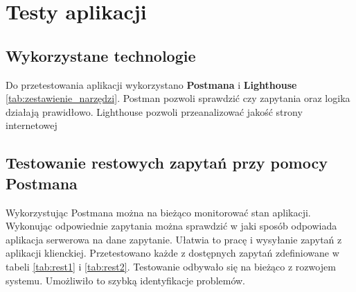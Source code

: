 \chapter{Testy aplikacji}

\section{Wykorzystane technologie}

Do przetestowania aplikacji wykorzystano \textbf{Postmana} i \textbf{Lighthouse} \ref{tab:zestawienie_narzędzi}. Postman pozwoli sprawdzić czy zapytania oraz logika działają prawidłowo. Lighthouse pozwoli przeanalizować jakość strony internetowej


\section{Testowanie restowych zapytań przy pomocy Postmana}

Wykorzystując Postmana można na bieżąco monitorować stan aplikacji. Wykonując odpowiednie zapytania można sprawdzić w jaki sposób odpowiada aplikacja serwerowa na dane zapytanie. Ułatwia to pracę i wysyłanie zapytań z aplikacji klienckiej. Przetestowano każde z dostępnych zapytań zdefiniowane w tabeli \ref{tab:rest1} i \ref{tab:rest2}. Testowanie odbywało się na bieżąco z rozwojem systemu. Umożliwiło to szybką identyfikacje problemów.

